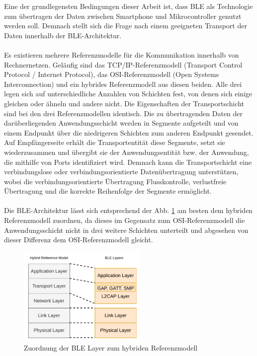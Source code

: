 Eine der grundlegensten Bedingungen dieser Arbeit ist, dass BLE als Technologie zum übertragen der Daten zwischen Smartphone und Mikrocontroller genutzt werden soll. Demnach stellt sich die Frage nach einem geeigneten Transport der Daten innerhalb der BLE-Architektur.
\\\\
Es existieren mehrere Referenzmodelle für die Kommunikation innerhalb von Rechnernetzen. Geläufig sind das TCP/IP-Referenzmodell (Transport Control Protocol / Internet Protocol), das OSI-Referenzmodell (Open Systems Interconnection) und ein hybrides Referenzmodell aus diesen beiden. Alle drei legen sich auf unterschiedliche Anzahlen von Schichten fest, von denen sich einige gleichen oder ähneln und andere nicht. Die Eigenschaften der Transportschicht sind bei den drei Referenzmodellen identisch. Die zu übertragenden Daten der darüberliegenden Anwendungsschicht werden in Segmente aufgeteilt und von einem Endpunkt über die niedrigeren Schichten zum anderen Endpunkt gesendet. Auf Empfängerseite erhält die Transportentität diese Segmente, setzt sie wiederzusammen und übergibt sie der Anwendungsentität bzw. der Anwendung, die mithilfe von Ports identifiziert wird. Demnach kann die Transportschicht eine verbindungslose oder verbindungsorientierte Datenübertragung unterstützen, wobei die verbindungsorientierte Übertragung Flusskontrolle, verlustfreie Übertragung und die korrekte Reihenfolge der Segmente ermöglicht. \cite{Baun2019_36-40}
\\\\
Die BLE-Architektur lässt sich entsprechend der Abb. \ref{fig: hyb referenzmodell ble} am besten dem hybriden Referenzmodell zuordnen, da dieses im Gegensatz zum OSI-Referenzmodell die Anwendungsschicht nicht in drei weitere Schichten unterteilt und abgesehen von dieser Differenz dem OSI-Referenzmodell gleicht.

\begin{figure}[H]
    \centering
    \includegraphics[width=0.55\textwidth]{graphics/hybr_referenzmodell_zu_ble.pdf}
    \caption[Zuordnung der BLE Layer zum hybriden Referenzmodell]{Zuordnung der BLE Layer zum hybriden Referenzmodell}
    \label{fig: hyb referenzmodell ble}
\end{figure}

